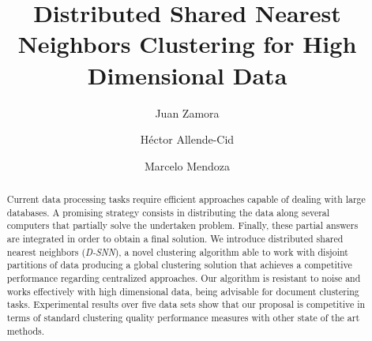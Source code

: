\documentclass[preprint,12pt,authoryear,review]{elsarticle}
\begin{document}
\begin{frontmatter}



\title{Distributed Shared Nearest Neighbors Clustering for High Dimensional Data}


\author[aut1]{Juan Zamora}

\author[aut1]{H\'ector Allende-Cid}

\author[aut2,aut3]{Marcelo Mendoza}


\address[aut1]{Pontificia Universidad Cat\'olica de Valpara\'iso}

\address[aut2]{Universidad T\'ecnica Federico Santa Mar\'ia}

\address[aut3]{Centro Científico Tecnológico de Valparaíso -- CCTVal}

\begin{abstract}
Current data processing tasks require efficient approaches capable of dealing with large databases. A promising strategy consists in distributing the data along several computers that partially solve the undertaken problem. Finally, these partial answers are integrated in order to obtain a final solution. We introduce distributed shared nearest neighbors (\textit{D-SNN}), a novel clustering algorithm able to work with disjoint partitions of data producing a global clustering solution that achieves a competitive performance regarding centralized approaches. Our algorithm is resistant to noise and works effectively with high dimensional data, being advisable for document clustering tasks. Experimental results over five data sets show that our proposal is competitive in terms of standard clustering quality performance measures with other state of the art methods. 
\end{abstract}


\end{frontmatter}
\end{document}

